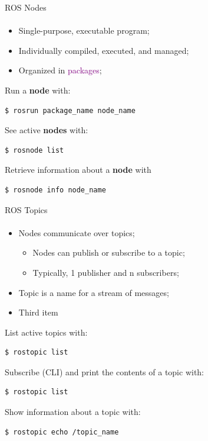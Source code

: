 \documentclass[aspectratio=169]{beamer}
\begin{document}
\begin{frame}[fragile]{ROS Nodes}
	\framesubtitle{ }
	\begin{minipage}{0.6\textwidth}
    \begin{itemize}
        \item Single-purpose, executable program;
        \item Individually compiled, executed, and managed;
        \item Organized in \textcolor{purple}{packages};
    \end{itemize}

	Run a \textbf{node} with:
	\begin{lstlisting}[language=bash]
		$ rosrun package_name node_name
    \end{lstlisting}

	See active \textbf{nodes} with:
	\begin{lstlisting}[language=bash]
		$ rosnode list
    \end{lstlisting}

	Retrieve information about a \textbf{node} with
	\begin{lstlisting}[language=bash]
		$ rosnode info node_name
    \end{lstlisting}


\end{minipage}
\begin{minipage}{0.4\textwidth}
	
\end{minipage}
\end{frame}

\begin{frame}[fragile]{ROS Topics}
	\framesubtitle{ }
	\begin{minipage}{0.6\textwidth}
    \begin{itemize}
        \item Nodes communicate over topics;
        \begin{itemize}
			\item Nodes can publish or subscribe to a topic;
			\item Typically, 1 publisher and n subscribers;
		\end{itemize}
        \item Topic is a name for a stream of messages;
        \item Third item
    \end{itemize}
	List active topics with:
	\begin{lstlisting}[language=bash]
		$ rostopic list
    \end{lstlisting}
	Subscribe (CLI) and print the contents of a topic with:
	\begin{lstlisting}[language=bash]
		$ rostopic list
    \end{lstlisting}
	Show information about a topic with:
	\begin{lstlisting}[language=bash]
		$ rostopic echo /topic_name
    \end{lstlisting}
\end{minipage}
\begin{minipage}{0.4\textwidth}
	
\end{minipage}
\end{frame}
\end{document}
